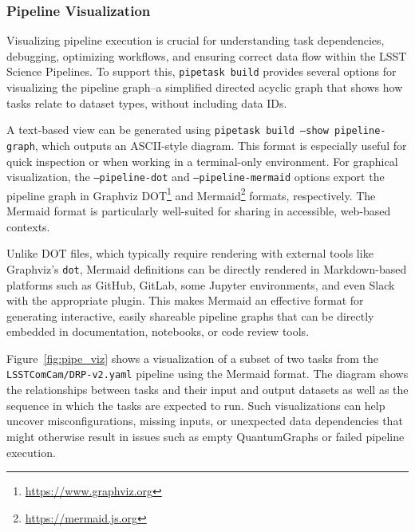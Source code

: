 \subsubsection{Pipeline Visualization}
\label{sec:pipeline_visualization}

Visualizing pipeline execution is crucial for understanding task dependencies, debugging, optimizing workflows, and ensuring correct data flow within the LSST Science Pipelines.
To support this, \texttt{pipetask build} provides several options for visualizing the pipeline graph--a simplified directed acyclic graph that shows how tasks relate to dataset types, without including data IDs.

A text-based view can be generated using \texttt{pipetask build --show pipeline-graph}, which outputs an ASCII-style diagram.
This format is especially useful for quick inspection or when working in a terminal-only environment.
For graphical visualization, the \texttt{--pipeline-dot} and \texttt{--pipeline-mermaid} options export the pipeline graph in Graphviz DOT\footnote{\url{https://www.graphviz.org}} and Mermaid\footnote{\url{https://mermaid.js.org}} formats, respectively.
The Mermaid format is particularly well-suited for sharing in accessible, web-based contexts.

Unlike DOT files, which typically require rendering with external tools like Graphviz's \texttt{dot}, Mermaid definitions can be directly rendered in Markdown-based platforms such as GitHub, GitLab, some Jupyter environments, and even Slack with the appropriate plugin.
This makes Mermaid an effective format for generating interactive, easily shareable pipeline graphs that can be directly embedded in documentation, notebooks, or code review tools.

Figure~\ref{fig:pipe_viz} shows a visualization of a subset of two tasks from the \texttt{LSSTComCam/DRP-v2.yaml} pipeline using the Mermaid format.
The diagram shows the relationships between tasks and their input and output datasets as well as the sequence in which the tasks are expected to run.
Such visualizations can help uncover misconfigurations, missing inputs, or unexpected data dependencies that might otherwise result in issues such as empty QuantumGraphs or failed pipeline execution.

